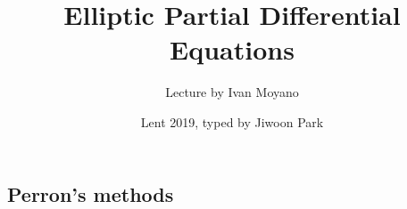 \documentclass[10pt,a4paper]{article}
\DeclarePairedDelimiter\bignorm{\lVert}{\rVert}
\newcommand{\doublerule}[1][.4pt]{%
  \noindent
  \makebox[0pt][l]{\rule[.7ex]{\linewidth}{#1}}%
  \rule[.3ex]{\linewidth}{#1}}
\begin{document}
\title{Elliptic Partial Differential Equations}
\author{Lecture by Ivan Moyano}
\date{Lent 2019, typed by Jiwoon Park}

\maketitle

\newcommand{\latinmodern}[1]{{\fontfamily{lmss}\selectfont
\textbf{#1}
}}

\newcommand{\thm}{\latinmodern{Theorem) }}
\newcommand{\thmnum}[1]{\latinmodern{Theorem #1) }}
\newcommand{\defi}{\latinmodern{Definition) }}
\newcommand{\definum}[1]{\latinmodern{Definition #1) }}
\newcommand{\lem}{\latinmodern{Lemma) }}
\newcommand{\lemnum}[1]{\latinmodern{Lemma #1) }}
\newcommand{\prop}{\latinmodern{Proposition) }}
\newcommand{\propnum}[1]{\latinmodern{Proposition #1) }}
\newcommand{\corr}{\latinmodern{Corollary) }}
\newcommand{\corrnum}[1]{\latinmodern{Corollary #1) }}
\newcommand{\pf}{\textbf{proof) }}

\newcommand{\lap}{\triangle} %
\newcommand{\s}{\vspace{10pt}}
\newcommand{\bull}{$\bullet$}
\newcommand{\sta}{$\star$}
\newcommand{\reals}{\mathbb{R}}

\newcommand{\norms}[2]{\bignorm[\big]{#1}_{#2}}
\newcommand{\snorms}[2]{\bignorm[\small]{#1}_{#2}}

\newcommand{\eop}{\hfill  \textsl{(End of proof)} $\square$} %
\newcommand{\eos}{\hfill  \textsl{(End of statement)} $\square$} %

\newcommand{\intN}{\mathbb{Z}_N}
\newcommand{\nat}{\mathbb{N}}

\newcommand{\abs}[1]{\big| #1 \big|}
\newcommand{\avg}{\mathbb{E}}
\newcommand{\prob}{\mathbb{P}}
\newcommand{\borel}{\mathscr{B}}
\newcommand{\EE}{\mathscr{E}}
\newcommand{\pa}{\partial}

\newcommand{\call}[1]{\quad \cdots\cdots\cdots\,\,(#1)}

\renewcommand{\vec}{\underline}
\renewcommand{\bar}{\overline}

\def\doubleunderline#1{\underline{\underline{#1}}}

\newcommand{\newday}{\doublerule[0.5pt]}

\setlength\parindent{0pt}
\s

\subsection*{Perron's methods}
\end{document}
